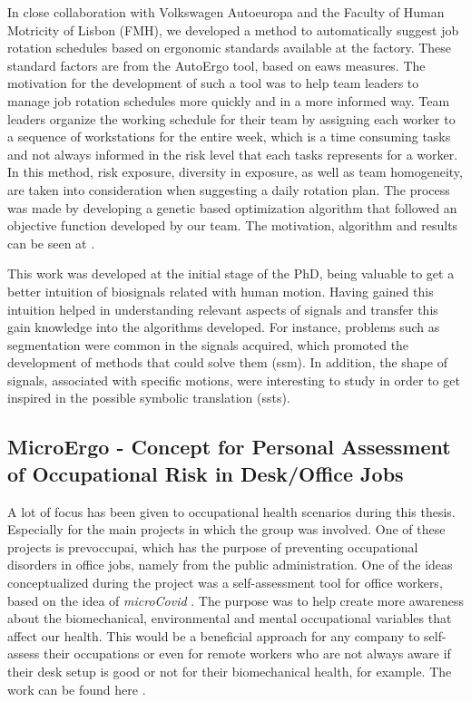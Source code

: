In close collaboration with Volkswagen Autoeuropa and the Faculty of Human Motricity of Lisbon (FMH), we developed a method to automatically suggest job rotation schedules based on ergonomic standards available at the factory. These standard factors are from the AutoErgo tool, based on \gls{eaws} measures. The motivation for the development of such a tool was to help team leaders to manage job rotation schedules more quickly and in a more informed way. Team leaders organize the working schedule for their team by assigning each worker to a sequence of workstations for the entire week, which is a time consuming tasks and not always informed in the risk level that each tasks represents for a worker. In this method, risk exposure, diversity in exposure, as well as team homogeneity, are taken into consideration when suggesting a daily rotation plan. The process was made by developing a genetic based optimization algorithm that followed an objective function developed by our team. The motivation, algorithm and results can be seen at \cite{jobrotation1}.
\par
This work was developed at the initial stage of the PhD, being valuable to get a better intuition of biosignals related with human motion. Having gained this intuition helped in understanding relevant aspects of signals and transfer this gain knowledge into the algorithms developed. For instance, problems such as segmentation were common in the signals acquired, which promoted the development of methods that could solve them (\gls{ssm}). In addition, the shape of signals, associated with specific motions, were interesting to study in order to get inspired in the possible symbolic translation (\gls{ssts}).

\subsection{MicroErgo - Concept for Personal Assessment of Occupational Risk in Desk/Office Jobs}

A lot of focus has been given to occupational health scenarios during this thesis. Especially for the main projects in which the group was involved. One of these projects is \gls{prevoccupai}, which has the purpose of preventing occupational disorders in office jobs, namely from the public administration. One of the ideas conceptualized during the project was a self-assessment tool for office workers, based on the idea of \textit{microCovid} \cite{microcovid}. The purpose was to help create more awareness about the biomechanical, environmental and mental occupational variables that affect our health. This would be a beneficial approach for any company to self-assess their occupations or even for remote workers who are not always aware if their desk setup is good or not for their biomechanical health, for example. The work can be found here \cite{microergo}.

